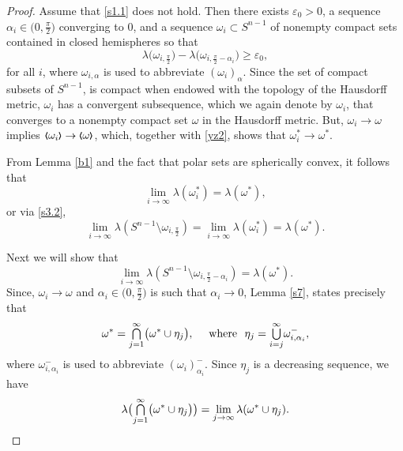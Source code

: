 \documentclass{cpamart1}     %
\theoremstyle{definition}
\theoremstyle{remark}
\newcommand*{\medcup}{\mathsmaller{\bigcup}}%
\newcommand*{\medcap}{\mathsmaller{\bigcap}}%
\newcommand{\sn}{S^{n-1}}
\newcommand{\bla}{\raise.2ex\hbox{$\scriptstyle\pmb \langle$}}
\newcommand{\bra}{\raise.2ex\hbox{$\scriptstyle\pmb \rangle$}}
\begin{document}
\begin{proof}
Assume that \eqref{s1.1} does not hold. Then there exists $\varepsilon_0>0$, a sequence $\alpha_i \in \big(0, \frac\pi2\big)$ converging to 0, and a sequence $\omega_i\subset \sn$ of nonempty compact sets contained in closed hemispheres so that
\begin{equation}\label{s1.2}
\lambda \big(\omega_{i,\frac\pi2}\big) -
\lambda\big(\omega_{i,\frac\pi2-\alpha_i}\big)
\ge \varepsilon_0,
\end{equation}
for all $i$, where $\omega_{i, \alpha}$ is used to abbreviate $(\omega_i)_\alpha$.
Since the set of compact subsets of $\sn$, is compact when endowed with the
topology of the Hausdorff metric, $\omega_i$ has a convergent subsequence,
which we again denote by $\omega_i$,
that converges to a nonempty compact set $\omega$ in the Hausdorff metric.
But, $\omega_i \to \omega$ implies $\bla \omega_i\bra \to\bla\omega\bra$, which, together with \eqref{yz2}, shows that $\omega_i^* \to \omega^*$.




From Lemma \ref{b1} and the fact that polar sets are spherically convex,
it follows that
\begin{equation*}
\lim_{i\to \infty} \lambda(\omega_i^*) = \lambda(\omega^*),
\end{equation*}
or via \eqref{s3.2},
\begin{equation}\label{s1.4}
\lim_{i\to \infty} \lambda(\sn \setminus \omega_{i,\frac\pi2})
= \lim_{i\to \infty} \lambda(\omega_i^*) = \lambda(\omega^*).
\end{equation}


Next we will show that
\begin{equation} \label{s1.5}
\lim_{i\to\infty} \lambda(\sn \setminus \omega_{i,\frac\pi2-\alpha_i})= \lambda(\omega^*).
\end{equation}
Since,
$\omega_i \to \omega$ and
$\alpha_i \in \big(0, \frac\pi2\big)$ is such that $\alpha_i \to 0$,
Lemma \ref{s7}, states precisely that
\begin{equation}\label{s1.6}
\omega^* = \medcap\limits_{j=1}^\infty\big(\omega^* \cup \eta_j\big), \quad
\text{ where }\ \eta_j = \medcup\limits_{i=j}^\infty \omega_{i,\alpha_i}^-,
\end{equation}
where $\omega_{i, \alpha_i}^-$ is used to abbreviate $(\omega_i)_{\alpha_i}^-$.
Since $\eta_j$ is a decreasing sequence, we have
\begin{equation}\label{s1.7}
\lambda \big(\medcap\limits_{j=1}^\infty\big(\omega^* \cup \eta_j\big) \big)
= \lim_{j\to \infty} \lambda(\omega^* \cup \eta_j).
\end{equation}




\end{proof}
\end{document}
